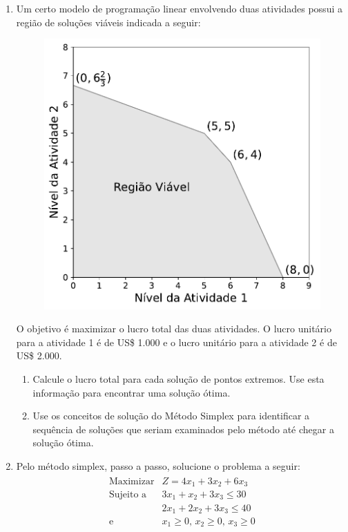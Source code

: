 \documentclass[a4paper,11pt]{article}
\begin{document}
\begin{enumerate}
    \item Um certo modelo de programação linear envolvendo duas atividades possui a região de soluções viáveis indicada a seguir:
    
    \begin{figure}[H]
        \centering
        \includegraphics[scale=.45]{images/exerc_4.1-3.pdf}
    \end{figure}

    O objetivo é maximizar o lucro total das duas atividades. O lucro unitário para a atividade 1 é de US\$ 1.000 e o lucro unitário para a atividade 2 é de US\$ 2.000.
    \begin{enumerate}
        \item Calcule o lucro total para cada solução de pontos extremos. Use esta informação para encontrar uma solução ótima.
        \item Use os conceitos de solução do Método Simplex para identificar a sequência de soluções que seriam examinados pelo método até chegar a solução ótima.
    \end{enumerate}




    \item Pelo método simplex, passo a passo, solucione o problema a seguir:
    \begin{align*}
        \begin{matrix}
            \text{Maximizar} & Z = 4x_1 + 3x_2 + 6x_3 \\
            \text{Sujeito a} & 3x_1 + x_2 + 3x_3 \leq 30 \\
                             & 2x_1 + 2x_2 + 3x_3 \leq 40 \\
            \text{e}         & x_1 \geq 0 \text{, } x_2 \geq 0 \text{, } x_3 \geq 0
        \end{matrix}
    \end{align*}






\end{enumerate}
\end{document}
